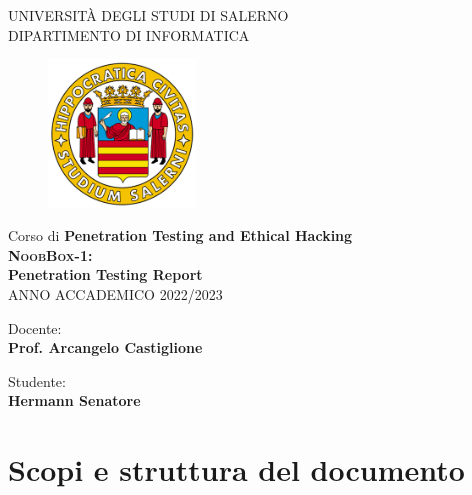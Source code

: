 \documentclass[a4paper, 12pt, oneside]{article}
\begin{document}
\begin{titlepage}
    \begin{center}
        \LARGE{\uppercase{Università degli Studi di Salerno}}\\
        \vspace{5mm}
    	\uppercase{\normalsize Dipartimento di Informatica }\\
    \end{center}
    \begin{figure}[H]
        \centering
        \includegraphics[width=0.35\textwidth]{logo_unisa}
    \end{figure}
    
    \begin{center}
        \normalsize{Corso di \textbf{Penetration Testing and Ethical Hacking}}\\
    	\vspace{10mm}
    	\LARGE{\textbf{\textsc{NoobBox-1}:\\ Penetration Testing Report}}\\
    	\vspace{3mm}
        \large{\uppercase{Anno Accademico 2022/2023}}
    \end{center}

    \vspace{70mm}
    \noindent
    \begin{minipage}[t]{0.6\textwidth}
    	Docente:\\\textbf{Prof. Arcangelo Castiglione}
    	\vspace{10mm}\\
    \end{minipage}
    \hfill
    \begin{minipage}[t]{0.4\textwidth}\raggedleft
    	Studente: \\\textbf{Hermann Senatore}
    \end{minipage}
\end{titlepage}

\tableofcontents
\newpage

\section{Scopi e struttura del documento}
\end{document}
